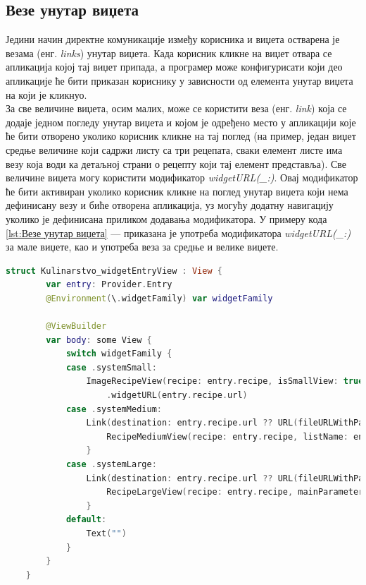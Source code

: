 \documentclass[12pt,oneside]{memoir}
\begin{document}
\subsection{Везе унутар виџета}
\indent Једини начин директне комуникације између корисника и виџета остварена је везама (енг. \textit{links}) унутар виџета. Када корисник кликне на виџет отвара се апликација којој тај виџет припада, а програмер може конфигурисати који део апликације ће бити приказан кориснику у зависности од елемента унутар виџета на који је кликнуо.
\\
\indent За све величине виџета, осим малих, може се користити веза (енг. \textit{link}) која се додаје једном погледу унутар виџета и којом је одређено место у апликацији које ће бити отворено уколико корисник кликне на тај поглед (на пример, један виџет средње величине који садржи листу са три рецепата, сваки елемент листе има везу која води ка детаљној страни о рецепту који тај елемент представља). Све величине виџета могу користити модификатор \textit{widgetURL(\_:)}. Овај модификатор ће бити активиран уколико корисник кликне на поглед унутар виџета који нема дефинисану везу и биће отворена апликација, уз могућу додатну навигацију уколико је дефинисана приликом додавања модификатора. У примеру кода \ref{lst:Везе унутар виџета} ---  приказана је употреба модификатора \textit{widgetURL(\_:)} за мале виџете, као и употреба веза за средње и велике виџете.

\begin{lstlisting}[caption=\textit{{Везе унутар виџета}}, label={lst:Везе унутар виџета}, language=Swift, frame=single]
    struct Kulinarstvo_widgetEntryView : View {
        var entry: Provider.Entry
        @Environment(\.widgetFamily) var widgetFamily
        
        @ViewBuilder
        var body: some View {
            switch widgetFamily {
            case .systemSmall:
                ImageRecipeView(recipe: entry.recipe, isSmallView: true)
                    .widgetURL(entry.recipe.url)
            case .systemMedium:
                Link(destination: entry.recipe.url ?? URL(fileURLWithPath: "")) {
                    RecipeMediumView(recipe: entry.recipe, listName: entry.parameterToShow)
                }
            case .systemLarge:
                Link(destination: entry.recipe.url ?? URL(fileURLWithPath: "")) {
                    RecipeLargeView(recipe: entry.recipe, mainParameter: entry.parameterToShow)
                }
            default:
                Text("")
            }
        }
    }
\end{lstlisting}
\end{document}

